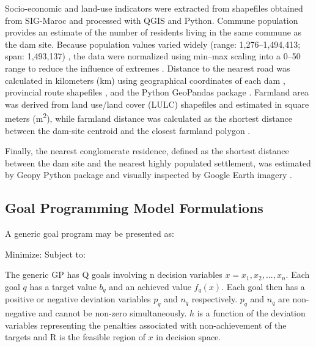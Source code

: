 Socio-economic and land-use indicators were extracted from shapefiles obtained from SIG-Maroc \cite{SIG_Maroc_Shapefiles} and processed with QGIS and Python. Commune population provides an estimate of the number of residents living in the same commune as the dam site. Because population values varied widely (range: 1,276–1,494,413; span: 1,493,137) \cite{Ersoy2022}, the data were normalized using min–max scaling into a 0–50 range to reduce the influence of extremes \cite{Kosareva2018,population_normalization_py}. Distance to the nearest road was calculated in kilometers (km) using geographical coordinates of each dam \cite{Coordinates2025}, provincial route shapefiles \cite{routes2025}, and the Python GeoPandas package \cite{roadsCode2025}. Farmland area was derived from land use/land cover (LULC) shapefiles \cite{LULC_MegaArchive} and estimated in square meters (m\textsuperscript{2}), while farmland distance was calculated as the shortest distance between the dam-site centroid and the closest farmland polygon \cite{farmlandAreaCode2025}.

Finally, the nearest conglomerate residence, defined as the shortest distance between the dam site and the nearest highly populated settlement, was estimated by Geopy Python package \cite{congloResidence2025} and visually inspected by Google Earth imagery \cite{congolerateResidenceGearth2025}.



\subsection{Goal Programming Model Formulations}

A generic goal program \cite{jones2010} may be presented as:

Minimize:
            \EqGGPMinFunctionOne
Subject to:
            \EqGGPMinFunctionSubTwo
            \EqGGPMinFunctionSubThree
            \EqGGPMinFunctionSubFour    

The generic GP has Q goals involving n decision variables $x = x_1,x_2, ...,x_n.$ Each goal $q$ has a target value $b_q$ and an achieved value $f_q(x)$. Each goal then has a positive or negative deviation variables $p_q$ and $n_q$ respectively. $p_q$ and $n_q$ are non-negative and cannot be non-zero simultaneously. $h$ is a function of the deviation variables representing the penalties associated with non-achievement of the targets and R is the feasible region of $x$ in decision space.

